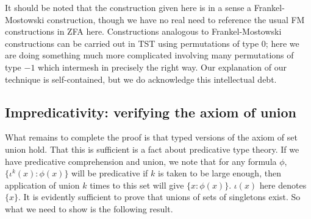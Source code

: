\documentclass[112pt]{article}
\theoremstyle{definition}
\theoremstyle{remark}
\begin{document}
It should be noted that the construction given here is in a sense a Frankel-Mostowski construction, though we have no real need to reference the usual
FM constructions in ZFA here.  Constructions analogous to Frankel-Mostowski constructions can be carried out in TST using permutations of type 0;  here we are doing something much more complicated involving many permutations of type $-1$ which intermesh in precisely the right way.  Our explanation of our technique is self-contained, but we do acknowledge this intellectual debt.



\newpage
\subsection{Impredicativity:  verifying the axiom of union}\label{ss:impredicativity}

What remains to complete the proof is that typed versions of the axiom of set union hold.  That this is sufficient is a fact about predicative type theory.
If we have predicative comprehension and union, we note that for any formula $\phi$, $\{\iota^k(x):\phi(x)\}$ will be predicative if $k$ is taken to be large enough, then application of union $k$ times to this set will give $\{x:\phi(x)\}$.  $\iota(x)$ here denotes $\{x\}$.  It is evidently sufficient to prove that unions of sets of singletons exist.
{So what we need to show is the following result.}
\end{document}

